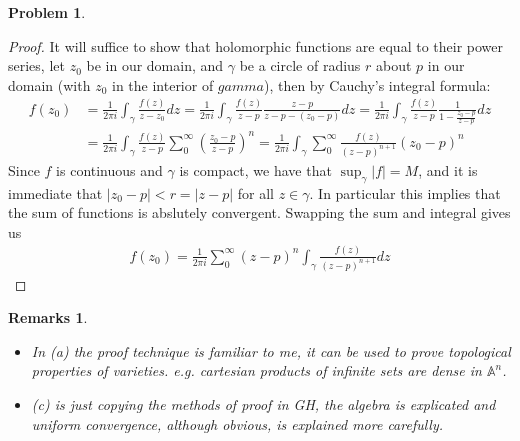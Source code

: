 \documentclass[11pt]{article}
\theoremstyle{definition}
\newtheorem*{rmks}{Remarks}
\newtheorem{pb}{Problem}
\newcommand{\abs}[1]{\lvert#1\rvert}
\begin{document}
\begin{pb}
        \begin{proof}
            It will suffice to show that holomorphic functions are equal to their power series, let \(z_0\) be in our domain, and \(\gamma\) be a circle of radius \(r\) about \(p\) in our domain (with \(z_0\) in the interior of \(gamma\)), then by Cauchy's integral formula:
            \begin{align*}
                f(z_0) &= \frac{1}{2\pi i}\int_{\gamma} \frac{f(z)}{z-z_0}dz = \frac{1}{2\pi i}\int_{\gamma} \frac{f(z)}{z-p} \frac{z-p}{z-p - (z_0 - p)}dz = \frac{1}{2\pi i}\int_{\gamma} \frac{f(z)}{z-p} \frac{1}{1 - \frac{z_0-p}{z-p}}dz \\
                &= \frac{1}{2\pi i}\int_{\gamma} \frac{f(z)}{z-p} \sum_0^\infty \left(\frac{z_0-p}{z-p}\right)^n = \frac{1}{2\pi i}\int_{\gamma}\sum_0^\infty \frac{f(z)}{(z-p)^{n+1}}(z_0-p)^n
            \end{align*}
            Since \(f\) is continuous and \(\gamma\) is compact, we have that \(\sup_\gamma\abs{f} = M\), and it is immediate that \(\abs{z_0 - p} < r = \abs{z - p}\) for all \(z \in \gamma\). In particular this implies that the sum of functions is abslutely convergent. Swapping the sum and integral gives us
            \begin{align*}
                f(z_0) = \frac{1}{2\pi i} \sum_0^\infty (z - p)^n \int_\gamma \frac{f(z)}{(z - p)^{n+1}}dz
            \end{align*}
        \end{proof}
        \begin{rmks}\; \newline
            \begin{itemize}
                \item \emph{In (a) the proof technique is familiar to me, it can be used to prove topological properties of varieties. e.g. cartesian products of infinite sets are dense in \(\mathbb{A}^n\).}
                \item \emph{(c) is just copying the methods of proof in GH, the algebra is explicated and uniform convergence, although obvious, is explained more carefully.}
            \end{itemize}
        \end{rmks}
    \end{pb}
\end{document}
